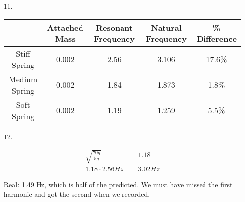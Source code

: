 \documentclass[10pt, letterpaper]{article}
\begin{document}
\begin{itemize}
        \item[11.]\mbox{}
        
        \begin{center}
            \begin{tabular}{|c|c|c|c|c|}
                \hline
                & Attached Mass & Resonant Frequency & Natural Frequency & \% Difference    \\
                \hline
                Stiff Spring & 0.002 & 2.56 & 3.106 & 17.6\% \\
                \hline
                Medium Spring & 0.002 & 1.84 & 1.873 & 1.8\% \\
                \hline
                Soft Spring & 0.002 & 1.19 & 1.259 & 5.5\% \\
                \hline
            \end{tabular}
        \end{center}

        \item [12.]
        
        \begin{align*}
            \sqrt{\frac{70g}{5g}}    & = 1.18    \\
            1.18 \cdot 2.56 Hz       & = 3.02 Hz
        \end{align*}

        Real: 1.49 Hz, which is half of the predicted. We must have missed the first harmonic and got the second when we recorded.

    \end{itemize}
    
\end{document}
